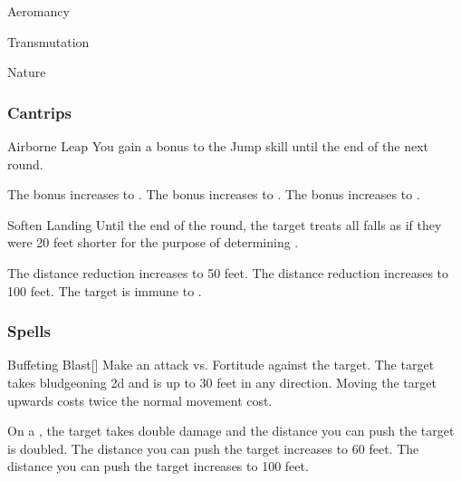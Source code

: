 
\begin{spellsection}{Aeromancy}

\begin{spellheader}
\end{spellheader}


 Transmutation

 Nature

\subsubsection{Cantrips}


\begin{freeability}{Airborne Leap}
You gain a  bonus to the Jump skill until the end of the next round.

\rankline
{} The bonus increases to .
 The bonus increases to .
 The bonus increases to .
\end{freeability}


\begin{freeability}{Soften Landing}
Until the end of the round, the target treats all falls as if they were 20 feet shorter for the purpose of determining .

\rankline
{} The distance reduction increases to 50 feet.
 The distance reduction increases to 100 feet.
 The target is immune to .
\end{freeability}

\end{spellsection}


\subsubsection{Spells}


\lowercase{\hypertarget{spell:Buffeting Blast}{}}\label{spell:Buffeting Blast}
\begin{freeability}[Rank 1]{\hypertarget{spell:Buffeting Blast}{Buffeting Blast}}[]
Make an attack vs. Fortitude against the target.
\hit The target takes bludgeoning  \minus2d and is  up to 30 feet in any direction.
Moving the target upwards costs twice the normal movement cost.

\rankline
{} On a , the target takes double damage and the distance you can push the target is doubled.
 The distance you can push the target increases to 60 feet.
 The distance you can push the target increases to 100 feet.
\end{freeability}
\vspace{0.25em}



